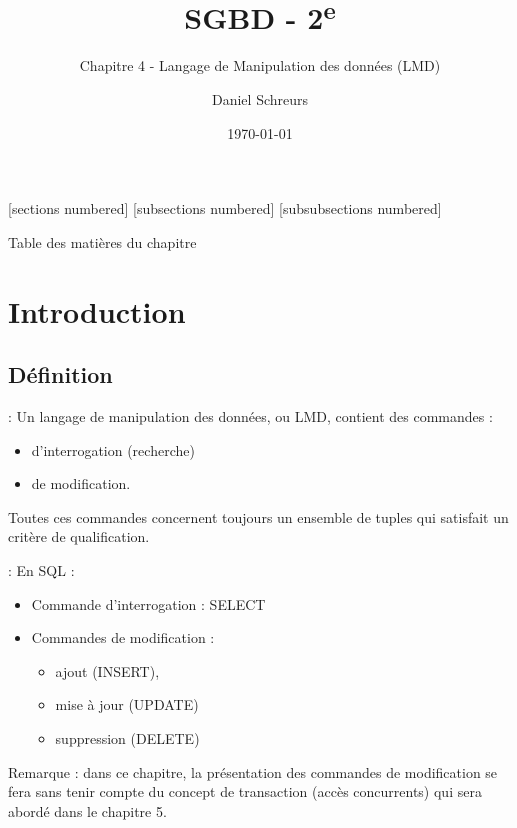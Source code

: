 \documentclass[10pt]{beamer}
\title{SGBD - 2\textsuperscript{e}}
\subtitle{Chapitre 4 - Langage de Manipulation des données (LMD)}
\date{\today}
\author{Daniel Schreurs}
\institute{Haute École de Province de Liège}
\begin{document}
\maketitle


[sections numbered]
[subsections numbered]
[subsubsections numbered]
\begin{frame}[allowframebreaks]{Table des matières du chapitre}
    \tableofcontents[subsectionstyle=show/show/hide,subsubsectionstyle=show/show/hide,]
\end{frame}


\section{Introduction}
\tocss
\subsection{Définition}
\begin{frame}{\secname : \subsecname}
    Un langage de manipulation des données, ou LMD, contient des commandes :
    \begin{itemize}
        \item d'interrogation (recherche)
        \item de modification.
    \end{itemize}
    Toutes ces commandes concernent toujours un ensemble de tuples qui satisfait un critère de qualification.
\end{frame}

\begin{frame}{\secname : \subsecname}
    En SQL :
    \begin{itemize}
        \item Commande d'interrogation : SELECT
        \item Commandes de modification :
              \begin{itemize}
                  \item ajout (INSERT),
                  \item mise à jour (UPDATE)
                  \item suppression (DELETE)
              \end{itemize}
    \end{itemize}
    Remarque : dans ce chapitre, la présentation des commandes de modification se fera sans tenir compte du concept de transaction (accès concurrents) qui sera abordé dans le chapitre 5.
\end{frame}
\end{document}
